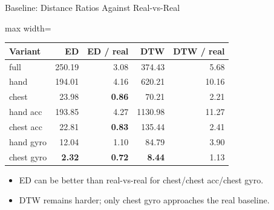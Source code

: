\documentclass[aspectratio=169,11pt]{ctexbeamer}
\newcommand{\best}[1]{\textcolor{goodgreen}{\textbf{#1}}}
\begin{document}
\begin{frame}{Baseline: Distance Ratios Against Real-vs-Real}
\small
\begin{adjustbox}{max width=\textwidth}
\begin{tabular}{lrrrr}
\toprule
Variant & ED & ED / real & DTW & DTW / real \\
\midrule
full & 250.19 & 3.08 & 374.43 & 5.68 \\
hand & 194.01 & 4.16 & 620.21 & 10.16 \\
chest & 23.98 & \best{0.86} & 70.21 & 2.21 \\
hand acc & 193.85 & 4.27 & 1130.98 & 11.27 \\
chest acc & 22.81 & \best{0.83} & 135.44 & 2.41 \\
hand gyro & 12.04 & 1.10 & 84.79 & 3.90 \\
chest gyro & \best{2.32} & \best{0.72} & \best{8.44} & 1.13 \\
\bottomrule
\end{tabular}
\end{adjustbox}
\vspace{0.5em}
\begin{itemize}
  \item ED can be better than real-vs-real for chest/chest acc/chest gyro.
  \item DTW remains harder; only chest gyro approaches the real baseline.
\end{itemize}
\end{frame}
\end{document}
